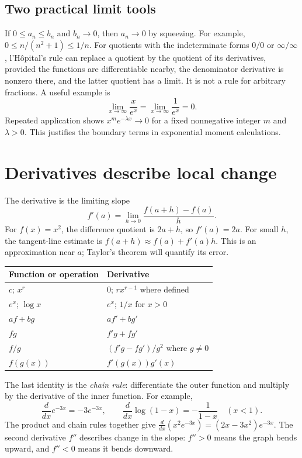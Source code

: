 \subsection*{Two practical limit tools}
If $0\le a_n\le b_n$ and $b_n\to0$, then $a_n\to0$ by squeezing.
For example, $0\le n/(n^2+1)\le1/n$.
For quotients with the indeterminate forms $0/0$ or $\infty/\infty$,
l'H\^opital's rule can replace a quotient by the quotient of its
derivatives, provided the functions are differentiable nearby, the
denominator derivative is nonzero there, and the latter quotient has a
limit. It is not a rule for arbitrary fractions. A useful example is
\[
 \lim_{x\to\infty}\frac{x}{e^x}
 =\lim_{x\to\infty}\frac1{e^x}=0.
\]
Repeated application shows $x^m e^{-\lambda x}\to0$ for a fixed
nonnegative integer $m$ and $\lambda>0$. This justifies the boundary
terms in exponential moment calculations.

\section{Derivatives describe local change}
\label{sec:calc-derivatives}

The derivative is the limiting slope
\[
 f'(a)=\lim_{h\to0}\frac{f(a+h)-f(a)}h.
\]
For $f(x)=x^2$, the difference quotient is $2a+h$, so $f'(a)=2a$.
For small $h$, the tangent-line estimate is
$f(a+h)\approx f(a)+f'(a)h$. This is an approximation near $a$;
Taylor's theorem will quantify its error.

\begin{center}
\begin{tabular}{@{}ll@{}}
\toprule
Function or operation & Derivative \\\midrule
$c$; $x^r$ & $0$; $r x^{r-1}$ where defined \\
$e^x$; $\log x$ & $e^x$; $1/x$ for $x>0$ \\
$af+bg$ & $af'+bg'$ \\
$fg$ & $f'g+fg'$ \\
$f/g$ & $(f'g-fg')/g^2$ where $g\ne0$ \\
$f(g(x))$ & $f'(g(x))g'(x)$ \\\bottomrule
\end{tabular}
\end{center}

The last identity is the \emph{chain rule}: differentiate the outer
function and multiply by the derivative of the inner function. For example,
\[
 \frac{d}{dx}e^{-3x}=-3e^{-3x},\qquad
 \frac{d}{dx}\log(1-x)=-\frac1{1-x}\quad(x<1).
\]
The product and chain rules together give
$\frac{d}{dx}(x^2e^{-3x})=(2x-3x^2)e^{-3x}$.
The second derivative $f''$ describes change in the slope: $f''>0$
means the graph bends upward, and $f''<0$ means it bends downward.

